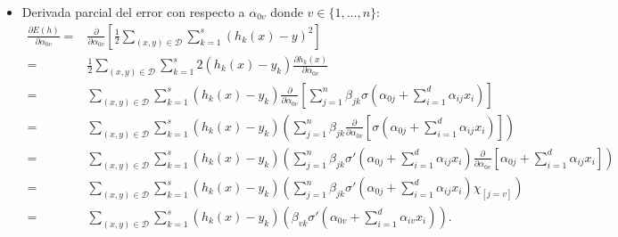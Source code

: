 \begin{itemize}
    \item Derivada parcial del error con respecto a $\alpha_{0 v}$ donde $v \in \{1, \ldots, n\}$:
    \begin{align} \label{eq:parcial_alpha_cero}
        \frac{\partial E(h)}{\partial \alpha_{0 v}} 
        = &
        \frac{\partial}{\partial \alpha_{0 v}}
        \left[
            \frac{1}{2}
            \sum_{(x,y) \in \mathcal{D}}
            \sum_{k = 1}^s 
            \left(h_k(x) - y\right)^2
        \right]
        \\ %
        = &
        \frac{1}{2}
        \sum_{(x,y) \in \mathcal{D}}
        \sum_{k = 1}^s 
        2 \left(h_k(x) - y_k \right)
        \frac{\partial h_k(x)}{\partial \alpha_{0 v}} 
        \\ 
        = & %
        \sum_{(x,y) \in \mathcal{D}}
        \sum_{k = 1}^s 
        \left(h_k(x) - y_k \right)
        \frac{\partial}{\partial \alpha_{0 v}} 
        \left[
            \sum_{j = 1}^n 
                \beta_{j k}
                \sigma
                \left(  
                    \alpha_{0 j} +
                    \sum_{i=1}^d \alpha_{i j}x_i
                \right)
        \right] 
        \\ 
        = & %
        \sum_{(x,y) \in \mathcal{D}}
        \sum_{k = 1}^s 
        \left(h_k(x) - y_k \right)
        \left(
            \sum_{j = 1}^n 
            \beta_{j k}
            \frac{\partial}{\partial \alpha_{0 v}} 
            \left[
                \sigma
                \left(  
                    \alpha_{0 j} +
                    \sum_{i=1}^d \alpha_{i j}x_i
                \right)
            \right]
        \right) 
        \\ 
        = & %
        \sum_{(x,y) \in \mathcal{D}}
        \sum_{k = 1}^s 
        \left(h_k(x) - y_k \right)
        \left(
            \sum_{j = 1}^n 
            \beta_{j k}
            \sigma '
            \left(  
                \alpha_{0 j} +
                \sum_{i=1}^d \alpha_{i j}x_i
            \right)
            \frac{\partial}{\partial \alpha_{0 v}}    
            \left[
                \alpha_{0 j} +
                \sum_{i=1}^d \alpha_{i j}x_i
            \right]
        \right) 
        \\ 
        = & %
        \sum_{(x,y) \in \mathcal{D}}
        \sum_{k = 1}^s 
        \left(h_k(x) - y_k \right)
        \left(
            \sum_{j = 1}^n 
            \beta_{j k}
            \sigma '
            \left(  
                \alpha_{0 j} +
                \sum_{i=1}^d \alpha_{i j}x_i
            \right)   
            \chi_{[j = v]}
        \right) 
        \\ 
        = & %
        \sum_{(x,y) \in \mathcal{D}}
        \sum_{k = 1}^s 
        \left(h_k(x) - y_k \right)
        \left(
            \beta_{v k}
            \sigma '
            \left(  
                \alpha_{0 v} +
                \sum_{i=1}^d \alpha_{i v}x_i
            \right)   
        \right). 
    \end{align}


\end{itemize}
